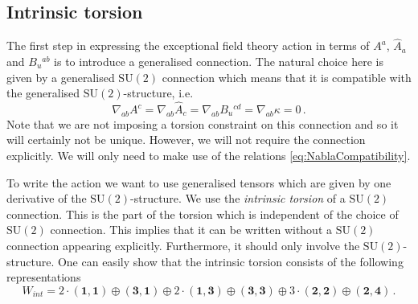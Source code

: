 \documentclass{PoS}
\newcommand{\SU}[1]{\mathrm{SU}( #1 )}
\newcommand{\mbf}[1]{\mathbf{#1}}
\begin{document}
\subsection{Intrinsic torsion}
The first step in expressing the exceptional field theory action in terms of $A^a$, $\hat{A}_a$ and $B_u{}^{ab}$ is to introduce a generalised connection. The natural choice here is given by a generalised $\SU{2}$ connection which means that it is compatible with the generalised $\SU{2}$-structure, i.e.
\begin{equation}
 \nabla_{ab} A^c = \nabla_{ab} \hat{A}_c = \nabla_{ab} B_u{}^{cd} = \nabla_{ab} \kappa = 0 \,. \label{eq:NablaCompatibility}
\end{equation}
Note that we are not imposing a torsion constraint on this connection and so it will certainly not be unique. However, we will not require the connection explicitly. We will only need to make use of the relations \eqref{eq:NablaCompatibility}.

To write the action we want to use generalised tensors which are given by one derivative of the $\SU{2}$-structure. We use the \emph{intrinsic torsion} of a $\SU{2}$ connection. This is the part of the torsion which is independent of the choice of $\SU{2}$ connection. This implies that it can be written without a $\SU{2}$ connection appearing explicitly. Furthermore, it should only involve the $\SU{2}$-structure. One can easily show that the intrinsic torsion consists of the following representations
\begin{equation}
 W_{int} = 2 \cdot \left(\mbf{1},\mbf{1}\right) \oplus \left(\mbf{3},\mbf{1}\right) \oplus 2 \cdot \left(\mbf{1},\mbf{3}\right) \oplus \left(\mbf{3},\mbf{3}\right) \oplus 3 \cdot \left(\mbf{2},\mbf{2}\right) \oplus \left(\mbf{2},\mbf{4}\right) \,. \label{eq:IntrinsicTorsionReps}
\end{equation}
\end{document}
